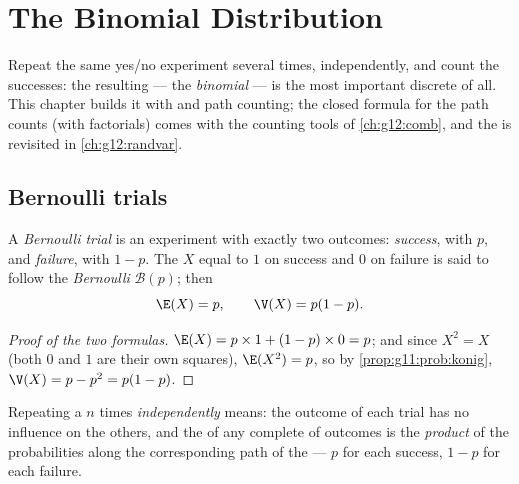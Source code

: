 \chapter{The Binomial Distribution}\label{ch:g11:binom}

Repeat the same yes/no experiment several times, independently, and count
the successes: the resulting  --- the \emph{binomial} --- is
the most important discrete  of all. This chapter builds it
with  and path counting; the closed formula for the path counts (with
factorials) comes with the counting tools of \cref{ch:g12:comb}, and the
 is revisited in \cref{ch:g12:randvar}.

\section{Bernoulli trials}

\begin{definition}\label{def:g11:binom:bernoulli}
A \emph{Bernoulli trial} is an experiment with
exactly two outcomes: \emph{success}, with  $p$, and
\emph{failure}, with  $1 - p$. The  $X$ equal
to $1$ on success and $0$ on failure is said to follow the
\emph{Bernoulli } $\mathcal B(p)$; then
\[
\E(X) = p,
\qquad
\V(X) = p(1 - p).
\]
\end{definition}

\begin{proof}[Proof of the two formulas]
$\E(X) = p \times 1 + (1-p) \times 0 = p$; and since $X^2 = X$ (both $0$
and $1$ are their own squares), $\E(X^2) = p$, so by
\cref{prop:g11:prob:konig}, $\V(X) = p - p^2 = p(1-p)$.
\end{proof}

\begin{definition}\label{def:g11:binom:repeated}
Repeating a  $n$ times \emph{independently} means: the
outcome of each trial has no influence on the others, and the 
of any complete  of outcomes is the \emph{product} of the
probabilities along the corresponding path of the  --- $p$ for each
success, $1 - p$ for each failure.
\end{definition}

